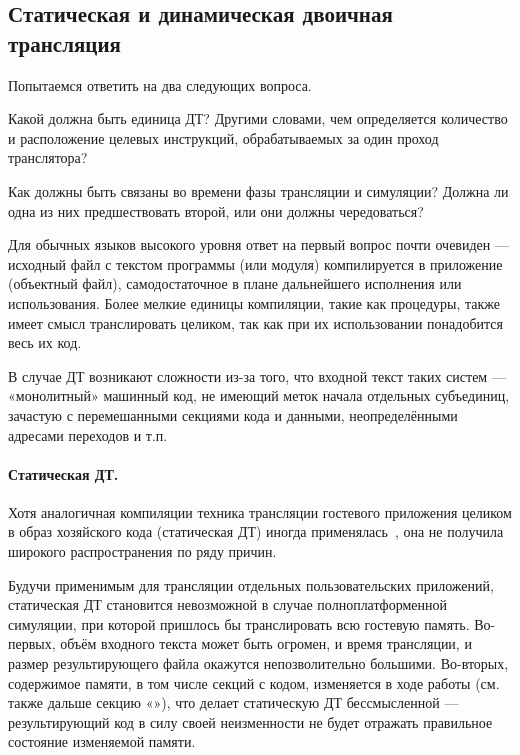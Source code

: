 \subsection[Статическая и динамическая двоичная трансляция]{Статическая и динамическая двоичная трансляция}

Попытаемся ответить на два следующих вопроса.
\begin{enumerate*}
    \item Какой должна быть единица ДТ? Другими словами, чем определяется количество и расположение целевых инструкций, обрабатываемых за один проход транслятора?
    \item Как должны быть связаны во времени фазы трансляции и симуляции? Должна ли одна из них предшествовать второй, или они должны чередоваться?
\end{enumerate*}

Для обычных языков высокого уровня ответ на первый вопрос почти очевиден — исходный файл с текстом программы (или модуля) компилируется в приложение (объектный файл), самодостаточное в плане дальнейшего исполнения или использования. Более мелкие единицы компиляции, такие как процедуры, также имеет смысл транслировать целиком, так как при их использовании понадобится весь их код.

В случае ДТ возникают сложности из-за того, что входной текст таких систем — «монолитный» машинный код, не имеющий меток начала отдельных субъединиц, зачастую с перемешанными секциями кода и данными, неопределёнными адресами переходов и т.п.

\paragraph{Статическая ДТ.} Хотя аналогичная компиляции техника трансляции гостевого приложения целиком в образ хозяйского кода (статическая ДТ) иногда применялась~\cite{Ray97digitalfx32}, она не получила широкого распространения по ряду причин.

Будучи применимым для трансляции отдельных пользовательских приложений, статическая ДТ становится невозможной в случае полноплатформенной симуляции, при которой пришлось бы транслировать всю гостевую память. Во-первых, объём входного текста может быть огромен, и время трансляции, и размер результирующего файла окажутся непозволительно большими. Во-вторых, содержимое памяти, в том числе секций с кодом, изменяется в ходе работы (см. также дальше секцию «»), что делает статическую ДТ бессмысленной — результирующий код в силу своей неизменности не будет отражать правильное состояние изменяемой памяти.


